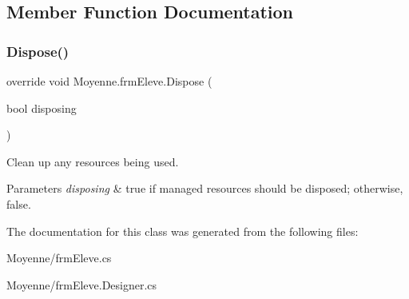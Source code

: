 \subsection{Member Function Documentation}
\mbox{\label{class_moyenne_1_1frm_eleve_a4cd27dbd3a275339051774b7faf22331}} 
\subsubsection{\texorpdfstring{Dispose()}{Dispose()}}
{\footnotesize\ttfamily override void Moyenne.\+frm\+Eleve.\+Dispose (\begin{DoxyParamCaption}\item[{bool}]{disposing }\end{DoxyParamCaption})\hspace{0.3cm}{\ttfamily [protected]}}



Clean up any resources being used. 


\begin{DoxyParams}{Parameters}
{\em disposing} & true if managed resources should be disposed; otherwise, false.\\
\hline
\end{DoxyParams}


The documentation for this class was generated from the following files\+:\begin{DoxyCompactItemize}
\item 
Moyenne/frm\+Eleve.\+cs\item 
Moyenne/frm\+Eleve.\+Designer.\+cs\end{DoxyCompactItemize}
